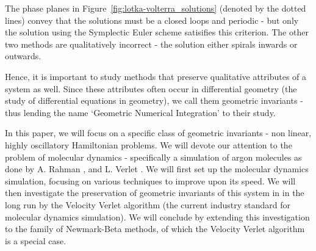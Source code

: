 \documentclass[../Main.tex]{subfiles}
\begin{document}
The phase planes in Figure~\ref{fig:lotka-volterra_solutions} (denoted by the dotted lines) convey that the solutions must be a closed loops and periodic - but only the solution using the Symplectic Euler scheme satisifies this criterion. The other two methods are qualitatively incorrect - the solution either spirals inwards or outwards.

Hence, it is important to study methods that preserve qualitative attributes of a system as well. Since these attributes often occur in differential geometry (the study of differential equations in geometry), we call them geometric invariants - thus lending the name `Geometric Numerical Integration' to their study.

In this paper, we will focus on a specific class of geometric invariants - non linear, highly oscillatory Hamiltonian problems. We will devote our attention to the problem of molecular dynamics - specifically a simulation of argon molecules as done by A. Rahman \cite{Rahman1964}, and L. Verlet \cite{Verlet1967}. We will first set up the molecular dynamics simulation, focusing on various techniques to improve upon its speed. We will then investigate the preservation of geometric invariants of this system in in the long run by the Velocity Verlet algorithm (the current industry standard for molecular dynamics simulation). We will conclude by extending this investigation to the family of Newmark-Beta methods, of which the Velocity Verlet algorithm is a special case.
\end{document}
